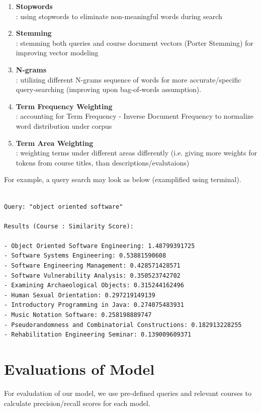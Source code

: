 \documentclass[twoside]{article}
\begin{document}
\begin{enumerate}
\item \textbf{Stopwords}\\
: using stopwords to eliminate non-meaningful words during search
\item \textbf{Stemming}\\
: stemming both queries and course document vectors (Porter Stemming) for improving vector modeling
\item \textbf{N-grams}\\
: utilizing different N-grams sequence of words for more accurate/specific query-searching (improving upon bag-of-words assumption).
\item \textbf{Term Frequency Weighting}\\
: accounting for Term Frequency - Inverse Document Frequency to normalize word distribution under corpus
\item \textbf{Term Area Weighting} \\
: weighting terms under different areas differently (i.e. giving more weights for tokens from course titles, than descriptions/evalutaions)
\end{enumerate}


For example, a query search may look as below (examplified using terminal).

\begin{verbatim}

Query: "object oriented software"

Results (Course : Similarity Score):

- Object Oriented Software Engineering: 1.48799391725
- Software Systems Engineering: 0.53881590608
- Software Engineering Management: 0.428571428571
- Software Vulnerability Analysis: 0.350523742702
- Examining Archaeological Objects: 0.315244162496
- Human Sexual Orientation: 0.297219149139
- Introductory Programming in Java: 0.274075483931
- Music Notation Software: 0.258198889747
- Pseudorandomness and Combinatorial Constructions: 0.182913228255
- Rehabilitation Engineering Seminar: 0.139009609371

\end{verbatim}

\section{Evaluations of Model}

For evaludation of our model, we use pre-defined queries and relevant courses to calculate precision/recall scores for each model.
\end{document}
